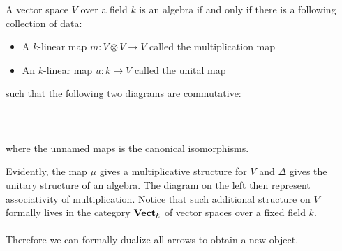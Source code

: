 \documentclass[a4paper]{article}
\begin{document}
\begin{prp}{}{} A vector space $V$ over a field $k$ is an algebra if and only if there is a following collection of data: 
\begin{itemize}
\item A $k$-linear map $m:V\otimes V\to V$ called the multiplication map
\item An $k$-linear map $u:k\to V$ called the unital map
\end{itemize}
such that the following two diagrams are commutative: \\~\\
\\~\\
where the unnamed maps is the canonical isomorphisms. 
\end{prp}

Evidently, the map $\mu$ gives a multiplicative structure for $V$ and $\Delta$ gives the unitary structure of an algebra. The diagram on the left then represent associativity of multiplication. Notice that such additional structure on $V$ formally lives in the category $\bold{Vect}_k$ of vector spaces over a fixed field $k$. \\~\\

Therefore we can formally dualize all arrows to obtain a new object. 
\end{document}
